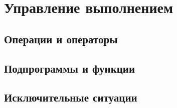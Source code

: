 \chapter{Управление выполнением}

\section{Операции и операторы}

\section{Подпрограммы и функции}

\section{Исключительные ситуации}
